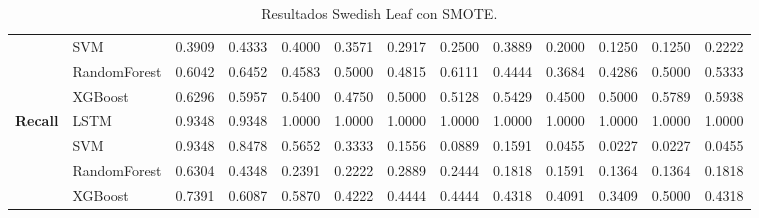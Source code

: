 \begin{table}[h]
\begin{adjustbox}{max width=15cm}
\begin{tabular}{|c|l|r|r|r|r|r|r|r|r|r|r|r|}
		& SVM &  0.3909 &  0.4333 &  0.4000 &  0.3571 &  0.2917 &  0.2500 &  0.3889 &  0.2000 &  0.1250 &  0.1250 &  0.2222 \\
		& RandomForest &  0.6042 &  0.6452 &  0.4583 &  0.5000 &  0.4815 &  0.6111 &  0.4444 &  0.3684 &  0.4286 &  0.5000 &  0.5333 \\
		& XGBoost &  0.6296 &  0.5957 &  0.5400 &  0.4750 &  0.5000 &  0.5128 &  0.5429 &  0.4500 &  0.5000 &  0.5789 &  0.5938 \\
		\hline
		\textbf{Recall} & LSTM &  0.9348 &  0.9348 &  1.0000 &  1.0000 &  1.0000 &  1.0000 &  1.0000 &  1.0000 &  1.0000 &  1.0000 &  1.0000 \\
		& SVM &  0.9348 &  0.8478 &  0.5652 &  0.3333 &  0.1556 &  0.0889 &  0.1591 &  0.0455 &  0.0227 &  0.0227 &  0.0455 \\
		& RandomForest &  0.6304 &  0.4348 &  0.2391 &  0.2222 &  0.2889 &  0.2444 &  0.1818 &  0.1591 &  0.1364 &  0.1364 &  0.1818 \\
		& XGBoost &  0.7391 &  0.6087 &  0.5870 &  0.4222 &  0.4444 &  0.4444 &  0.4318 &  0.4091 &  0.3409 &  0.5000 &  0.4318 \\
		\hline
	\end{tabular}
\end{adjustbox}
\caption{Resultados Swedish Leaf con SMOTE.}
\label{tab:SLeaf_SMOTE}
\end{table}
\newpage
